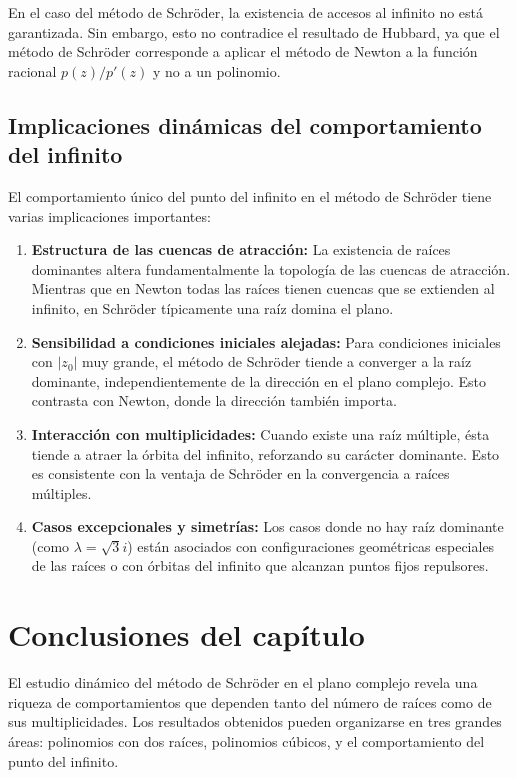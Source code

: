 En el caso del método de Schröder, la existencia de accesos al infinito no está garantizada. Sin embargo, esto no contradice el resultado de Hubbard, ya que el método de Schröder corresponde a aplicar el método de Newton a la función racional $p(z)/p'(z)$ y no a un polinomio.

\subsection{Implicaciones dinámicas del comportamiento del infinito}

El comportamiento único del punto del infinito en el método de Schröder tiene varias implicaciones importantes:

\begin{enumerate}
\item \textbf{Estructura de las cuencas de atracción:} La existencia de raíces dominantes altera fundamentalmente la topología de las cuencas de atracción. Mientras que en Newton todas las raíces tienen cuencas que se extienden al infinito, en Schröder típicamente una raíz domina el plano.

\item \textbf{Sensibilidad a condiciones iniciales alejadas:} Para condiciones iniciales con $|z_0|$ muy grande, el método de Schröder tiende a converger a la raíz dominante, independientemente de la dirección en el plano complejo. Esto contrasta con Newton, donde la dirección también importa.

\item \textbf{Interacción con multiplicidades:} Cuando existe una raíz múltiple, ésta tiende a atraer la órbita del infinito, reforzando su carácter dominante. Esto es consistente con la ventaja de Schröder en la convergencia a raíces múltiples.

\item \textbf{Casos excepcionales y simetrías:} Los casos donde no hay raíz dominante (como $\lambda=\sqrt{3}i$) están asociados con configuraciones geométricas especiales de las raíces o con órbitas del infinito que alcanzan puntos fijos repulsores.
\end{enumerate}

\section{Conclusiones del capítulo}

El estudio dinámico del método de Schröder en el plano complejo revela una riqueza de comportamientos que dependen tanto del número de raíces como de sus multiplicidades. Los resultados obtenidos pueden organizarse en tres grandes áreas: polinomios con dos raíces, polinomios cúbicos, y el comportamiento del punto del infinito.

